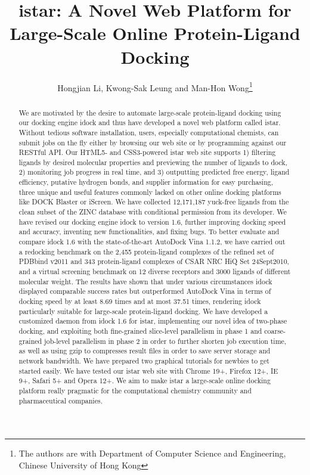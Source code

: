 \documentclass[12pt]{article}
\title{istar: A Novel Web Platform for Large-Scale Online Protein-Ligand Docking}
\author{Hongjian Li, Kwong-Sak Leung and Man-Hon Wong\thanks{The authors are with Department of Computer Science and Engineering, Chinese University of Hong Kong}}
\begin{document}
\maketitle

\begin{abstract}
We are motivated by the desire to automate large-scale protein-ligand docking using our docking engine idock and thus have developed a novel web platform called istar. Without tedious software installation, users, especially computational chemists, can submit jobs on the fly either by browsing our web site or by programming against our RESTful API. Our HTML5- and CSS3-powered istar web site supports 1) filtering ligands by desired molecular properties and previewing the number of ligands to dock, 2) monitoring job progress in real time, and 3) outputting predicted free energy, ligand efficiency, putative hydrogen bonds, and supplier information for easy purchasing, three unique and useful features commonly lacked on other online docking platforms like DOCK Blaster or iScreen. We have collected 12,171,187 yuck-free ligands from the clean subset of the ZINC database with conditional permission from its developer. We have revised our docking engine idock to version 1.6, further improving docking speed and accuracy, inventing new functionalities, and fixing bugs. To better evaluate and compare idock 1.6 with the state-of-the-art AutoDock Vina 1.1.2, we have carried out a redocking benchmark on the 2,455 protein-ligand complexes of the refined set of PDBbind v2011 and 343 protein-ligand complexes of CSAR NRC HiQ Set 24Sept2010, and a virtual screening benchmark on 12 diverse receptors and 3000 ligands of different molecular weight. The results have shown that under various circumstances idock displayed comparable success rates but outperformed AutoDock Vina in terms of docking speed by at least 8.69 times and at most 37.51 times, rendering idock particularly suitable for large-scale protein-ligand docking. We have developed a customized daemon from idock 1.6 for istar, implementing our novel idea of two-phase docking, and exploiting both fine-grained slice-level parallelism in phase 1 and coarse-grained job-level parallelism in phase 2 in order to further shorten job execution time, as well as using gzip to compresses result files in order to save server storage and network bandwidth. We have prepared two graphical tutorials for newbies to get started easily. We have tested our istar web site with Chrome 19+, Firefox 12+, IE 9+, Safari 5+ and Opera 12+. We aim to make istar a large-scale online docking platform really pragmatic for the computational chemistry community and pharmaceutical companies.
\end{abstract}
\end{document}
